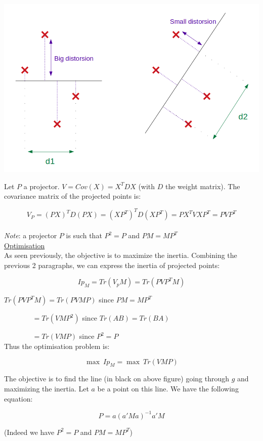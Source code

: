 \begin{center}
\includegraphics[scale=0.4]{PCA_projections.png}
\end{center}

Let $P$ a projector. $V = Cov(X) = X^TDX$ (with $D$ the weight matrix). The covariance matrix of the projected points is:

$$V_P = (PX)^TD(PX) = (XP^T)^TD(XP^T) = PX^TVXP^T = PVP^T$$ \\

\textit{Note}: a projector $P$ is such that $P^2=P$ and $PM = MP^T$ \\

\underline{Optimisation} \\

As seen previously, the objective is to maximize the inertia. Combining the previous 2 paragraphs, we can express the inertia of projected points:

$$Ip_M = Tr(V_pM) = Tr(PVP^TM)$$

$Tr(PVP^TM) = Tr(PVMP)$ since $PM = MP^T$

$~~~~~~~~~~~~~~~~~~= Tr(VMP^2)$ since $Tr(AB) = Tr(BA)$

$~~~~~~~~~~~~~~~~~~= Tr(VMP)$ since $P^2 = P$ \\

Thus the optimisation problem is:

$$\max~Ip_M = \max~Tr(VMP)$$

The objective is to find the line (in black on above figure) going through $g$ and maximizing the inertia. Let $a$ be a point on this line. We have the following equation:

$$P=a(a'Ma)^{-1}a'M$$

(Indeed we have $P^2=P$ and $PM = MP^T$) \\

